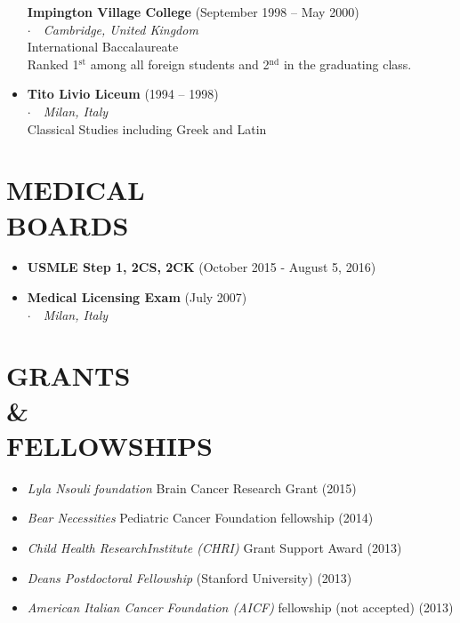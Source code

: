 \documentclass[line,margin]{res}
\newcommand{\superscript}[1]{\ensuremath{^{\textrm{#1}}}}
\newcommand{\titlestyle}[1]{{\bf #1}}
\newcommand{\placestyle}[1]{\footnotesize $\cdot$\ \ {\emph{#1}}}
\newcommand{\datestyle}[1]{{\tiny \dotfill} {\small (#1)}}
\begin{document}
\begin{resume}
\begin{itemize}
{  \titlestyle{Impington Village College} \datestyle{September 1998 -- May 2000} \\
  { \placestyle{Cambridge, United Kingdom} } \\
  International Baccalaureate \\
  Ranked 1\superscript{st} among all foreign students and 2\superscript{nd} in the graduating class.
}
\item {
  \titlestyle{Tito Livio Liceum} \datestyle{1994 -- 1998} \\
  { \placestyle{Milan, Italy} } \\
  Classical Studies including Greek and Latin
}
\end{itemize}

\section{MEDICAL \\ BOARDS}
\begin{itemize}
\item {
  \titlestyle {USMLE Step 1, 2CS, 2CK} \datestyle{October 2015 - August 5, 2016}
}
\item {
  \titlestyle {Medical Licensing Exam} \datestyle{July 2007} \\
  { \placestyle{Milan, Italy} }
}
\end{itemize}

\section{GRANTS \\ \& \\ FELLOWSHIPS}
\begin{itemize}
  \item \emph{Lyla Nsouli foundation} Brain Cancer Research Grant \datestyle{2015}
  \item \emph{Bear Necessities} Pediatric Cancer Foundation fellowship \datestyle{2014}
  \item \emph{Child Health ResearchInstitute (CHRI)} Grant Support Award \datestyle{2013}
  \item \emph{Deans Postdoctoral Fellowship} (Stanford University) \datestyle{2013}
  \item \emph{American Italian Cancer Foundation (AICF)} fellowship (not accepted) \datestyle{2013}
\end{itemize}

\newpage

\end{resume}
\end{document}
